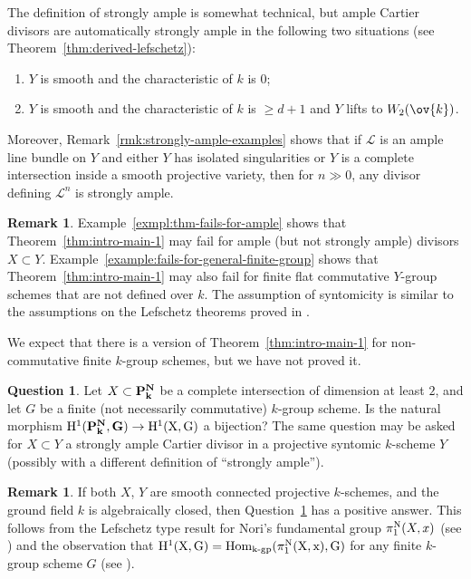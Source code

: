 \documentclass[11pt,reqno]{amsart}
\numberwithin{equation}{section}
\theoremstyle{definition}
\newtheorem{rmk}[thm]{Remark}
\newtheorem{question}[thm]{Question}
\begin{document}
The definition of strongly ample is somewhat technical, but ample Cartier divisors are automatically strongly ample in the following two situations (see Theorem~\ref{thm:derived-lefschetz}):
\begin{enumerate}
    \item $Y$ is smooth and the characteristic of $k$ is $0$;
    \item $Y$ is smooth and the characteristic of $k$ is $\geq d + 1$ and $Y$ lifts to $W_2(\ov{k})$.
\end{enumerate}
Moreover, Remark~\ref{rmk:strongly-ample-examples} shows that if $\mathcal{L}$ is an ample line bundle on $Y$ and either $Y$ has isolated singularities or $Y$ is a complete intersection inside a smooth projective variety, then for $n \gg 0$, any divisor defining $\mathcal{L}^n$ is strongly ample.

\begin{rmk} Example~\ref{exmpl:thm-fails-for-ample} shows that Theorem~\ref{thm:intro-main-1} may fail for ample (but not strongly ample) divisors $X\subset Y$. Example~\ref{example:fails-for-general-finite-group} shows that Theorem~\ref{thm:intro-main-1} may also fail for finite flat commutative $Y$-group schemes that are not defined over $k$. The assumption of syntomicity is similar to the assumptions on the Lefschetz theorems proved in \cite[Exp.\ XII, Cor.\ 3.6]{SGA2}.
\end{rmk}

We expect that there is a version of Theorem~\ref{thm:intro-main-1} for non-commutative finite $k$-group schemes, but we have not proved it. 

\begin{question}\label{question:non-commutative} Let $X\subset \bf{P}^N_k$ be a complete intersection of dimension at least $2$, and let $G$ be a finite (not necessarily commutative) $k$-group scheme. Is the natural morphism $\rm{H}^1(\bf{P}^N_k, G) \to \rm{H}^1(X, G)$ a bijection? The same question may be asked for $X \subset Y$ a strongly ample Cartier divisor in a projective syntomic
$k$-scheme $Y$ (possibly with a different definition of ``strongly ample'').
\end{question}

\begin{rmk} If both $X$, $Y$ are smooth connected projective $k$-schemes, and the ground field $k$ is algebraically closed, then Question~\ref{question:non-commutative} has a positive answer. This follows from the Lefschetz type result for Nori's fundamental group $\pi_1^{\rm{N}}(X, x)$ (see \cite[Th.~1.1]{Biswas-Holla}) and the observation that $\rm{H}^1(X, G) = \rm{Hom}_{k\text{-gp}}(\pi_1^{\rm{N}}(X, x), G)$ for any finite $k$-group scheme $G$ (see \cite[Prop.~3.11]{Nori}).
\end{rmk}
\end{document}
